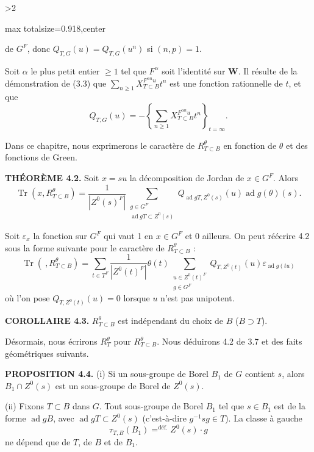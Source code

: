 \documentclass[9pt,twoside]{extarticle}
\newcommand{\EditionPage}[3]{%
  \ifnum#1>2\clearpage\fi
  \pdfbookmark[1]{Printed page #2}{fr-folio-#2}%
  \hypertarget{fr-physical-#1}{}%
  \noindent\begin{adjustbox}{max totalsize={\textwidth}{0.918\textheight},center}
  \begin{minipage}[t]{\textwidth}
  \fontsize{9.4}{11.1}\selectfont\justifying
  #3
  \end{minipage}
  \end{adjustbox}%
}
\begin{document}
\EditionPage{23}{124}{%
de \(G^F\), donc \(Q_{T,G}(u)=Q_{T,G}(u^n)\) si \((n,p)=1\).\par

Soit \(\alpha\) le plus petit entier \(\ge1\) tel que \(F^\alpha\) soit l'identité sur \(\mathbf W\). Il résulte de la démonstration de (3.3) que \(\sum_{n\ge1}X_{T\subset B}^{F^{\alpha n}u}t^n\) est une fonction rationnelle de \(t\), et que \[
\tag{4.1.2}
Q_{T,G}(u)
=-\left\{\sum_{n\ge1}X_{T\subset B}^{F^{\alpha n}u}t^n\right\}_{t=\infty}.
\]\par

Dans ce chapitre, nous exprimerons le caractère de \(R_{T\subset B}^\theta\) en fonction de \(\theta\) et des fonctions de Green.\par

\noindent\textbf{THÉORÈME 4.2.} Soit \(x=su\) la décomposition de Jordan de \(x\in G^F\). Alors \[
\operatorname{Tr}(x,R_{T\subset B}^\theta)
=
\frac1{|Z^0(s)^F|}
\sum_{\substack{g\in G^F\\\operatorname{ad}gT\subset Z^0(s)}}
Q_{\operatorname{ad}gT,Z^0(s)}(u)\operatorname{ad}g(\theta)(s).
\]\par

Soit \(\varepsilon_x\) la fonction sur \(G^F\) qui vaut 1 en \(x\in G^F\) et 0 ailleurs. On peut réécrire 4.2 sous la forme suivante pour le caractère de \(R_{T\subset B}^\theta\) : \[
\tag{4.2.1}
\operatorname{Tr}(\ ,R_{T\subset B}^\theta)
=
\sum_{t\in T^F}\frac1{|Z^0(t)^F|}\theta(t)
\sum_{\substack{u\in Z^0(t)^F\\g\in G^F}}
Q_{T,Z^0(t)}(u)\varepsilon_{\operatorname{ad}g(tu)}
\] où l'on pose \(Q_{T,Z^0(t)}(u)=0\) lorsque \(u\) n'est pas unipotent.\par

\noindent\textbf{COROLLAIRE 4.3.} \(R_{T\subset B}^\theta\) est indépendant du choix de \(B\) (\(B\supset T\)).\par

Désormais, nous écrirons \(R_T^\theta\) pour \(R_{T\subset B}^\theta\). Nous déduirons 4.2 de 3.7 et des faits géométriques suivants.\par

\noindent\textbf{PROPOSITION 4.4.} (i) Si un sous-groupe de Borel \(B_1\) de \(G\) contient \(s\), alors \(B_1\cap Z^0(s)\) est un sous-groupe de Borel de \(Z^0(s)\).\par

(ii) Fixons \(T\subset B\) dans \(G\). Tout sous-groupe de Borel \(B_1\) tel que \(s\in B_1\) est de la forme \(\operatorname{ad}gB\), avec \(\operatorname{ad}gT\subset Z^0(s)\) (c'est-à-dire \(g^{-1}sg\in T\)). La classe à gauche \[
\tau_{T,B}(B_1)\mathrel{\mathop{=}^{\mathrm{déf.}}}Z^0(s)\cdot g
\] ne dépend que de \(T\), de \(B\) et de \(B_1\).\par

}
\end{document}
